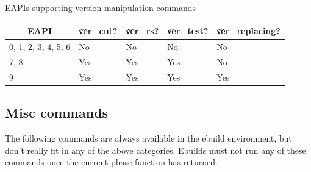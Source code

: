 \begin{centertable}{EAPIs supporting version manipulation commands}
    \label{tab:version-commands}
    \begin{tabular}{lllll}
      \toprule
      \multicolumn{1}{c}{\textbf{EAPI}} &
      \multicolumn{1}{c}{\textbf{\t{ver_cut}?}} &
      \multicolumn{1}{c}{\textbf{\t{ver_rs}?}} &
      \multicolumn{1}{c}{\textbf{\t{ver_test}?}} &
      \multicolumn{1}{c}{\textbf{\t{ver_replacing}?}} \\
      \midrule
      0, 1, 2, 3, 4, 5, 6 & No  & No  & No  & No  \\
      7, 8                & Yes & Yes & Yes & No  \\
      9                   & Yes & Yes & Yes & Yes \\
      \bottomrule
    \end{tabular}
\end{centertable}

\subsection{Misc commands}
The following commands are always available in the ebuild environment, but don't really fit in any
of the above categories. Ebuilds must not run any of these commands once the current phase function
has returned.

